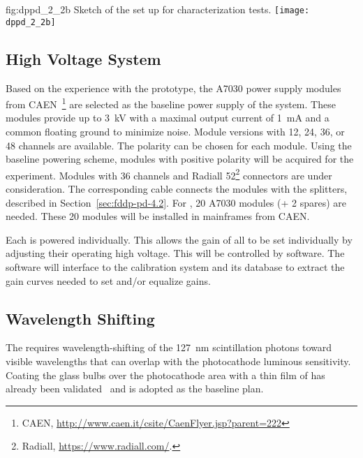 \begin{dunefigure}{fig:dppd_2_2b}
{Sketch of the set up for  characterization tests.}
\texttt{[image: dppd\_2\_2b]}
\end{dunefigure}


\subsection{High Voltage System}
\label{sec:dp-pds-HV}

Based on the experience with the  prototype, the A7030 power supply modules from CAEN~\footnote{CAEN\texttrademark{}, \url{http://www.caen.it/csite/CaenFlyer.jsp?parent=222}} are selected as the baseline power supply of the   system. 
These modules provide up to \SI{3}{kV} with a maximal output current of \SI{1}{mA} and a common floating ground to minimize noise. Module versions with \num{12}, \num{24}, \num{36}, or \num{48}  channels are available. The  polarity can be chosen for each module. Using the baseline  powering scheme, modules with positive  polarity will be acquired for the experiment. Modules with \num{36}  channels and Radiall \num{52}\footnote{Radiall\texttrademark{}, \url{https://www.radiall.com/}.}  connectors are under consideration. The corresponding  cable connects the modules with the  splitters, described in Section~\ref{sec:fddp-pd-4.2}. For \dpnumpmtch {}, \num{20} A7030 modules (+ \num{2} spares) are needed. These \num{20}  modules will be installed in mainframes from CAEN.

Each  is powered individually.  This allows the gain of all  to be set individually by adjusting their operating high voltage.
This will be controlled by software. The software will interface to the  calibration system and its database to extract the gain curves needed to set and/or equalize gains.

\subsection{Wavelength Shifting}
\label{sec:dppd-wls}

The \dual {} requires wavelength-shifting of the \SI{127}{nm} scintillation photons toward visible wavelengths that can overlap with the photocathode luminous sensitivity. Coating the  glass bulbs over the photocathode area with a thin film of   has already been validated~\cite{tpb} and is adopted as the baseline plan. 

